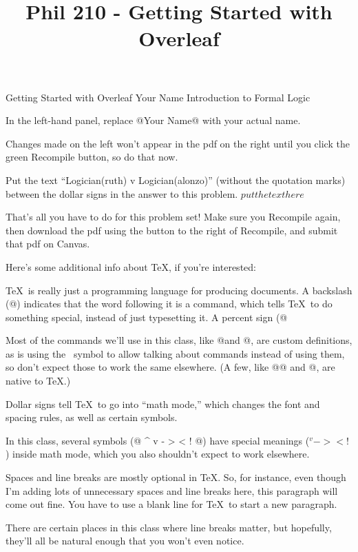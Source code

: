 
\title{Phil 210 - Getting Started with Overleaf} %

\heading
Getting Started with Overleaf
Your Name
Introduction to Formal Logic
\endheading

\problems
{}
In the left-hand panel, replace @Your Name@ with your actual name.

Changes made on the left won't appear in the pdf on the right until you click the green Recompile button, so do that now.

Put the text ``Logician(ruth) v Logician(alonzo)'' (without the quotation marks) between the dollar signs in the answer to this problem.
	\answer
	$ put the text here $
	\endanswer

That's all you have to do for this problem set! Make sure you Recompile again, then download the pdf using the button to the right of Recompile, and submit that pdf on Canvas.

\endproblems


Here's some additional info about \TeX, if you're interested:

\parskip\baselineskip \parindent\problemindent

\TeX\ is really just a programming language for producing documents. A backslash (@\@) indicates that the word following it is a command, which tells \TeX\ to do something special, instead of just typesetting it. A percent sign (@%

Most of the commands we'll use in this class, like @\heading@ and @\endanswer@, are custom definitions, as is using the \at\ symbol to allow talking about commands instead of using them, so don't expect those to work the same elsewhere. (A few, like @@ and @\TeX@, are native to \TeX.)

Dollar signs tell \TeX\ to go into ``math mode,'' which changes the font and spacing rules, as well as certain symbols.

In this class, several symbols (@ ^ v - > < ! @) have special meanings ($ ^ v - > < ! $) inside math mode, which you also shouldn't expect to work elsewhere.

Spaces and line breaks are mostly optional in \TeX. So, for instance,
even though
I'm adding   lots   of unnecessary spaces  and line
breaks
here, this paragraph   will come out  fine. You have    to use a blank line for \TeX\ to start a new paragraph.

There are certain places in this class where line breaks matter, but hopefully, they'll all be natural enough that you won't even notice.
\bye
